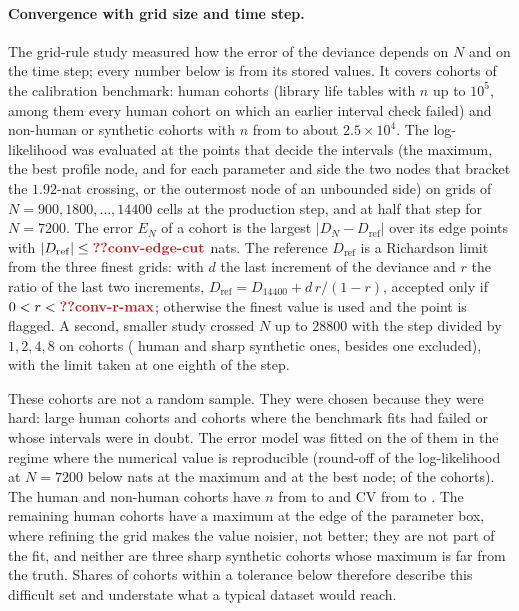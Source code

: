 \paragraph{Convergence with grid size and time step.} The grid-rule study measured how the error of the deviance depends on
$N$ and on the time step; every number below is from its stored values. It covers 
cohorts of the calibration benchmark:  human cohorts (library life tables with $n$ up to $10^{5}$, among
them every human cohort on which an earlier interval check failed) and  non-human or synthetic cohorts with
$n$ from  to about $2.5\times10^{4}$. The log-likelihood was evaluated at the points that decide the intervals
(the maximum, the best profile node, and for each parameter and side the two nodes that bracket the
$1.92$-nat crossing, or the outermost node of an unbounded side) on grids of $N=900,1800,\ldots,14400$ cells at the
production step, and at half that step for $N=7200$. The error $E_N$ of a cohort is the largest $|D_N-D_\mathrm{ref}|$ over its
edge points with $|D_\mathrm{ref}|\le\C{conv-edge-cut}$ nats. The reference $D_\mathrm{ref}$ is a Richardson limit
from the three finest grids: with $d$ the last increment of the deviance and $r$ the ratio of the last two increments,
$D_\mathrm{ref}=D_{14400}+d\,r/(1-r)$, accepted only if $0<r<\C{conv-r-max}$; otherwise the finest value is used and the
point is flagged. A second, smaller study crossed $N$ up to $28800$ with the step divided by $1,2,4,8$ on
 cohorts ( human and  sharp synthetic ones, besides one excluded), with the limit
taken at one eighth of the step.

These cohorts are not a random sample. They were chosen because they were hard: large human cohorts and cohorts where
the benchmark fits had failed or whose intervals were in doubt. The error model was fitted on the  of them in
the regime where the numerical value is reproducible (round-off of the log-likelihood at $N=7200$ below
 nats at the maximum and  at the best node;  of the 
cohorts). The  human and  non-human cohorts have $n$ from  to
 and CV from  to . The remaining human cohorts have a maximum at the edge of the
parameter box, where refining the grid makes the value noisier, not better; they are not part of the fit, and neither are three
sharp synthetic cohorts whose maximum is far from the truth. Shares of cohorts within a tolerance below therefore describe
this difficult set and understate what a typical dataset would reach.

